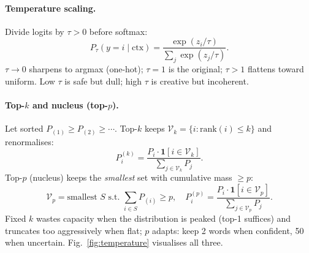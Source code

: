\paragraph{Temperature scaling.} Divide logits by $\tau>0$ before softmax:
\begin{equation}
P_\tau(y=i\mid\text{ctx}) = \frac{\exp(z_i/\tau)}{\sum_j \exp(z_j/\tau)}.
\label{eq:temperature}
\end{equation}
$\tau\to 0$ sharpens to argmax (one-hot); $\tau=1$ is the original; $\tau>1$ flattens toward uniform. Low $\tau$ is safe but dull; high $\tau$ is creative but incoherent.

\paragraph{Top-$k$ and nucleus (top-$p$).} Let sorted $P_{(1)}\ge P_{(2)}\ge\cdots$. Top-$k$ keeps $\mathcal{V}_k=\{i: \text{rank}(i)\le k\}$ and renormalises:
\begin{equation}
P^{(k)}_i = \frac{P_i\cdot\mathbf{1}[i\in\mathcal{V}_k]}{\sum_{j\in\mathcal{V}_k}P_j}.
\end{equation}
Top-$p$ (nucleus) keeps the \emph{smallest} set with cumulative mass $\ge p$:
\begin{equation}
\mathcal{V}_p = \text{smallest } S \text{ s.t. } \sum_{i\in S} P_{(i)}\ge p,\quad P^{(p)}_i=\frac{P_i\cdot\mathbf{1}[i\in\mathcal{V}_p]}{\sum_{j\in\mathcal{V}_p}P_j}.
\label{eq:topp}
\end{equation}
Fixed $k$ wastes capacity when the distribution is peaked (top-1 suffices) and truncates too aggressively when flat; $p$ adapts: keep 2 words when confident, 50 when uncertain. Fig.~\ref{fig:temperature} visualises all three.

